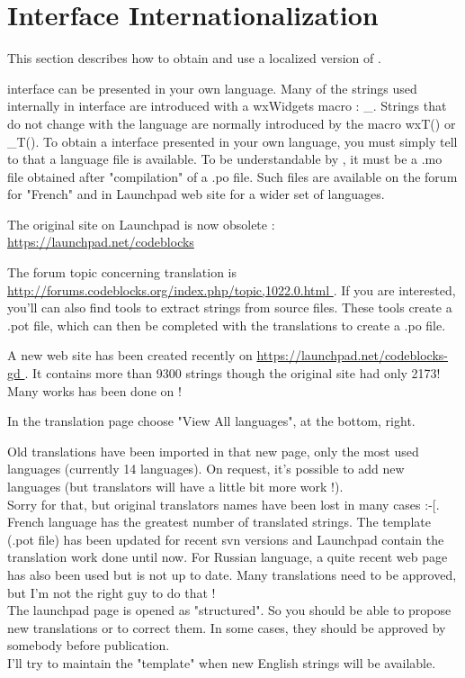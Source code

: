 \section{\codeblocks Interface Internationalization}\label{sec:cb_Internationalization}

This section describes how to obtain and use a localized version of \codeblocks.

\codeblocks interface can be presented in your own language. Many of the strings used internally in \codeblocks interface are introduced with a wxWidgets macro : \_. Strings that do not change with the language are normally introduced by the macro wxT() or \_T(). To obtain a \codeblocks interface presented in your own language, you must simply tell to \codeblocks that a language file is available. To be understandable by \codeblocks, it must be a .mo file obtained after "compilation" of a .po file. Such files are available on the forum for "French" and in Launchpad web site for a wider set of languages.

\begin{description}
\item The original site on Launchpad is now obsolete : \url{https://launchpad.net/codeblocks }
\item The forum topic concerning translation is \url{http://forums.codeblocks.org/index.php/topic,1022.0.html }. If you are interested, you'll can also find tools to extract strings from \codeblocks source files. These tools create a .pot file, which can then be completed with the translations to create a .po file. 
\item A new web site has been created recently on \url{https://launchpad.net/codeblocks-gd }. It contains more than 9300 strings though the original site had only 2173! Many works has been done on \codeblocks !
\end{description}

In the translation page choose "View All languages", at the bottom, right.

Old translations have been imported in that new page, only the most used languages (currently 14 languages). On request, it's possible to add new languages (but translators will have a little bit more work !).\\
Sorry for that, but original translators names have been lost in many cases  :-[. \\
French language has the greatest number of translated strings. The template (.pot file) has been updated for recent svn versions and Launchpad contain the translation work done until now. For Russian language, a quite recent web page has also been used but is not up to date. Many translations need to be approved, but I'm not the right guy to do that !\\
The launchpad page is opened as "structured". So you should be able to propose new translations or to correct them. In some cases, they should be approved by somebody before publication.\\
I'll try to maintain the "template" when new English strings will be available.

